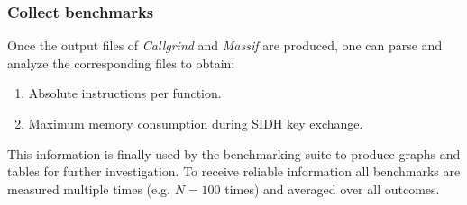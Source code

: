 \subsubsection{Collect benchmarks}
Once the output files of \textit{Callgrind} and \textit{Massif} are produced, one can parse and analyze the corresponding files to obtain:
\begin{enumerate}
\item Absolute instructions per function.
\item Maximum memory consumption during \gls{SIDH} key exchange.
\end{enumerate}
This information is finally used by the benchmarking suite to produce graphs and tables for further investigation. To receive reliable information all benchmarks are measured multiple times (e.g. $N=100$ times) and averaged over all outcomes.


